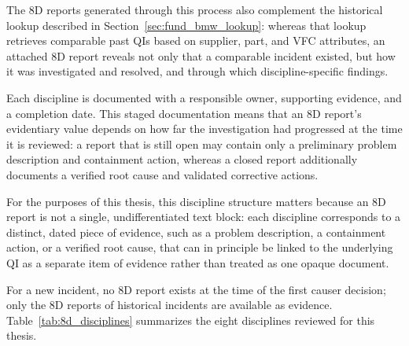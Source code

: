The 8D reports generated through this process also complement the
historical lookup described in Section~\ref{sec:fund_bmw_lookup}: whereas
that lookup retrieves comparable past QIs based on supplier, part, and
VFC attributes, an attached 8D report reveals not only that a comparable
incident existed, but how it was investigated and resolved, and through
which discipline-specific findings.

Each discipline is documented with a responsible owner, supporting
evidence, and a completion date. This staged documentation means that an
8D report's evidentiary value depends on how far the investigation had
progressed at the time it is reviewed: a report that is still open may
contain only a preliminary problem description and containment action,
whereas a closed report additionally documents a verified root cause and
validated corrective actions.

For the purposes of this thesis, this discipline structure matters because
an 8D report is not a single, undifferentiated text block: each discipline
corresponds to a distinct, dated piece of evidence, such as a problem
description, a containment action, or a verified root cause, that can in
principle be linked to the underlying QI as a separate item of evidence
rather than treated as one opaque document.

For a new incident, no 8D report exists at the time of the first causer
decision; only the 8D reports of historical incidents are available as
evidence. Table~\ref{tab:8d_disciplines} summarizes the eight disciplines
reviewed for this thesis.


